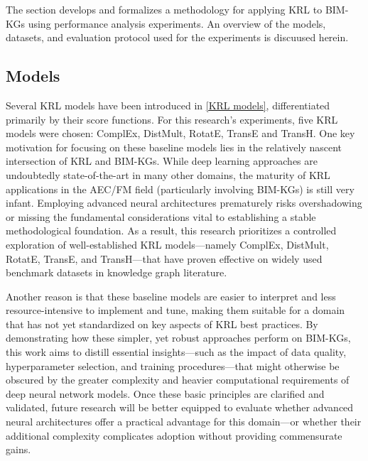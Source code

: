 The section develops and formalizes a methodology for applying \ac{KRL} to \acp{BIM-KG} using performance analysis experiments. An overview of the models, datasets, and evaluation protocol used for the experiments is discuused herein.

\subsection{Models}
Several \ac{KRL} models have been introduced in \autoref{KRL models}, differentiated primarily by their score functions. For this research's experiments, five \ac{KRL} models were chosen: ComplEx, DistMult, RotatE, TransE and TransH. One key motivation for focusing on these baseline models lies in the relatively nascent intersection of \ac{KRL} and \acp{BIM-KG}. While deep learning approaches are undoubtedly state-of-the-art in many other domains, the maturity of KRL applications in the \ac{AEC/FM} field (particularly involving \acp{BIM-KG}) is still very infant. Employing advanced neural architectures prematurely risks overshadowing or missing the fundamental considerations vital to establishing a stable methodological foundation. As a result, this research prioritizes a controlled exploration of well-established KRL models—namely ComplEx, DistMult, RotatE, TransE, and TransH—that have proven effective on widely used benchmark datasets in knowledge graph literature. 

Another reason is that these baseline models are easier to interpret and less resource-intensive to implement and tune, making them suitable for a domain that has not yet standardized on key aspects of \ac{KRL} best practices. By demonstrating how these simpler, yet robust approaches perform on \acp{BIM-KG}, this work aims to distill essential insights—such as the impact of data quality, hyperparameter selection, and training procedures—that might otherwise be obscured by the greater complexity and heavier computational requirements of deep neural network models. Once these basic principles are clarified and validated, future research will be better equipped to evaluate whether advanced neural architectures offer a practical advantage for this domain—or whether their additional complexity complicates adoption without providing commensurate gains.



